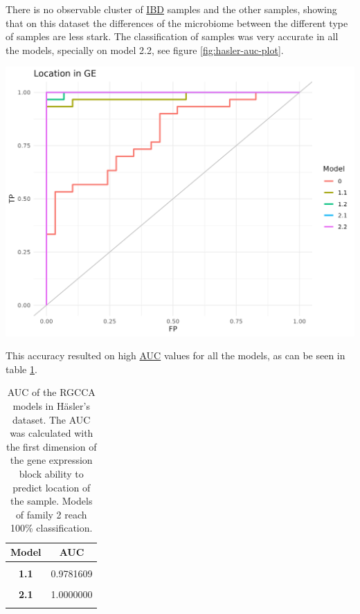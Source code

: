 \documentclass[
  12pt,
  a4paper,
  twoside,
  openright]{book}
\let\origfigure\figure
\let\endorigfigure\endfigure
\renewenvironment{figure}[1][2] {
    \expandafter\origfigure\expandafter[!htbp]
} {
    \endorigfigure
}
\begin{document}
There is no observable cluster of \protect\hyperlink{acronyms_IBD}{IBD} samples and the other samples, showing that on this dataset the differences of the microbiome between the different type of samples are less stark.
The classification of samples was very accurate in all the models, specially on model 2.2, see figure \ref{fig:hasler-auc-plot}.

\begin{figure}
\includegraphics[width=1\linewidth]{images/hasler-auc} \caption[AUC of RGCCA models in the Häsler's dataset]{AUC of models with RGCCA in the Häsler's dataset. The classification of the localization of the sample according to the first component of the gene expression of the models generated with RGCCA on the Häsler's dataset.}\label{fig:hasler-auc-plot}
\end{figure}

This accuracy resulted on high \protect\hyperlink{acronyms_AUC}{AUC} values for all the models, as can be seen in table \ref{tab:hasler-auc}.




\begin{table}[H]

\caption[AUC of the RGCCA models in Häsler's dataset. ]{\label{tab:hasler-auc}AUC of the RGCCA models in Häsler's dataset. The AUC was calculated with the first dimension of the gene expression block ability to predict location of the sample. Models of family 2 reach 100\% classification.}
\centering
\begin{tabular}[t]{>{}c|c}
\hline
\textbf{Model} & \textbf{AUC}\\
\hline
\textbf{\cellcolor{gray!6}{0}} & \cellcolor{gray!6}{0.8011494}\\
\hline
\textbf{1.1} & 0.9781609\\
\hline
\textbf{\cellcolor{gray!6}{1.2}} & \cellcolor{gray!6}{0.9977011}\\
\hline
\textbf{2.1} & 1.0000000\\
\hline
\textbf{\cellcolor{gray!6}{2.2}} & \cellcolor{gray!6}{1.0000000}\\
\hline
\end{tabular}
\end{table}
\end{document}

